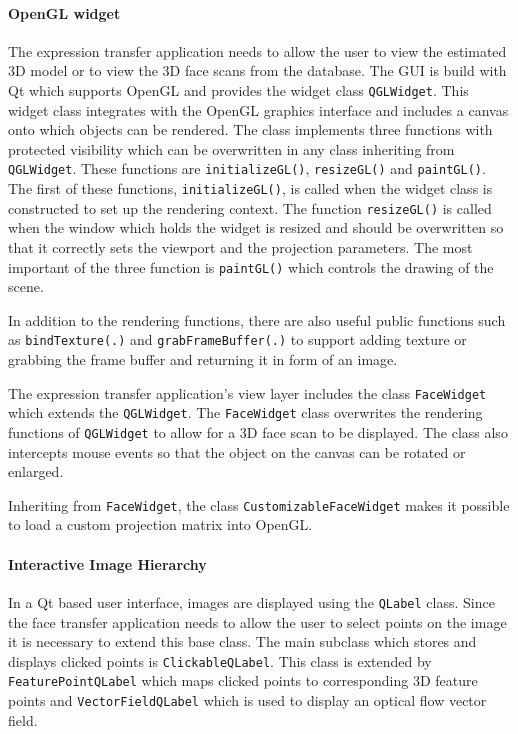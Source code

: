 \documentclass[11pt,a4paper,twoside]{report}
\begin{document}
\paragraph{OpenGL widget}
The expression transfer application needs to allow the user to view the
estimated 3D model or to view the 3D face scans from the database. The GUI is build with Qt
which supports OpenGL and provides the widget class \texttt{QGLWidget}. This
widget class integrates with the OpenGL graphics interface and includes a canvas
onto which objects can be rendered. The class implements three functions with
protected visibility which
can be overwritten in any class inheriting from \texttt{QGLWidget}. These
functions are \texttt{initializeGL()}, \texttt{resizeGL()} and
\texttt{paintGL()}. The first of these functions, \texttt{initializeGL()}, is
called when the widget class is constructed to set up the rendering context. The function \texttt{resizeGL()} is
called when the window which holds the widget is resized and should be
overwritten so that it correctly sets the viewport and the projection parameters. The most important of
the three function is \texttt{paintGL()} which controls the drawing of the
scene.

In addition to the rendering functions, there are also useful public functions
such as \texttt{bindTexture(.)} and \texttt{grabFrameBuffer(.)} to support
adding texture or grabbing the frame buffer and returning it in form of an
image.

The expression transfer application's view layer includes the class
\texttt{FaceWidget} which extends the \texttt{QGLWidget}. The \texttt{FaceWidget} class overwrites the rendering functions of \texttt{QGLWidget} to allow for a
3D face scan to be displayed. The class also intercepts mouse events so that the
object on the canvas can be rotated or enlarged.

Inheriting from \texttt{FaceWidget}, the class \texttt{CustomizableFaceWidget}
makes it possible to load a custom projection matrix into OpenGL.

\paragraph{Interactive Image Hierarchy}
In a Qt based user interface, images are displayed using the \texttt{QLabel} class. Since the
face transfer application needs to allow the user to select points on the image
it is necessary to extend this base class. The main subclass which stores and
displays clicked points is \texttt{ClickableQLabel}. This class is extended by
\texttt{FeaturePointQLabel} which maps clicked points to corresponding 3D
feature points and \texttt{VectorFieldQLabel} which is used to display an
optical flow vector field.
\end{document}
